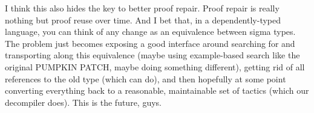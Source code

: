 I think this also hides the key to better proof repair. Proof repair is really nothing but proof reuse over time. And I bet that, in a dependently-typed language, you can think of any change as an equivalence between sigma types. The problem just becomes exposing a good interface around searching for and transporting along this equivalence (maybe using example-based search like the original PUMPKIN PATCH, maybe doing something different), getting rid of all references to the old type (which \toolname can do), and then hopefully at some point converting everything back to a reasonable, maintainable set of tactics (which our decompiler does). This is the future, guys.
